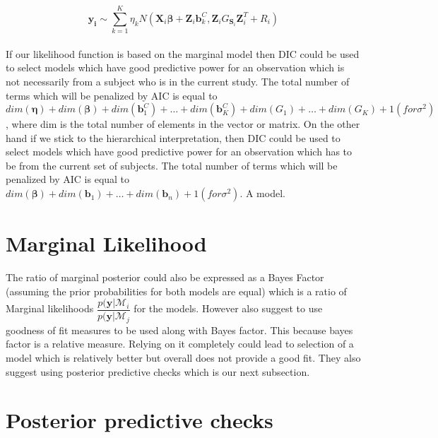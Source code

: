 $$\boldsymbol{y_i} \sim \sum_{k=1}^{K} \eta_k N(\boldsymbol{X}_{i}\boldsymbol{\beta} + \boldsymbol{Z}_{i}\boldsymbol{b}_k^C,\boldsymbol{Z}_{i}G_{\boldsymbol{S}_i}\boldsymbol{Z}_{i}^T + R_i)$$\\

If our likelihood function is based on the marginal model then DIC could be used to select models which have good predictive power for an observation which is not necessarily from a subject who is in the current study. The total number of terms which will be penalized by AIC is equal to $dim(\boldsymbol{\eta}) + dim(\boldsymbol{\beta}) + dim(\boldsymbol{b}_{1}^C) + \ldots + dim(\boldsymbol{b}_{K}^C) + dim(G_1) + \ldots + dim(G_K) + 1(for \sigma^2)$, where dim is the total number of elements in the vector or matrix. On the other hand if we stick to the hierarchical interpretation, then DIC could be used to select models which have good predictive power for an observation which has to be from the current set of subjects. The total number of terms which will be penalized by AIC is equal to $dim(\boldsymbol{\beta}) + dim(\boldsymbol{b}_1) + \ldots + dim(\boldsymbol{b}_n) + 1(for \sigma^2)$. A model.


\section{Marginal Likelihood}
\label{sec : marginal_likelihood}

The ratio of marginal posterior could also be expressed as a Bayes Factor (assuming the prior probabilities for both models are equal) which is a ratio of Marginal likelihoods $\dfrac{p(\boldsymbol{y}|\mathcal{M}_i}{p(\boldsymbol{y}|\mathcal{M}_j}$ for the models. 
However \citet{johannes_berkhof_bayesian_2003} also suggest to use goodness of fit measures to be used along with Bayes factor. This because bayes factor is a relative measure. Relying on it completely could lead to selection of a model which is relatively better but overall does not provide a good fit. They also suggest using posterior predictive checks which is our next subsection.

\section{Posterior predictive checks}
\label{sec : ppc}

